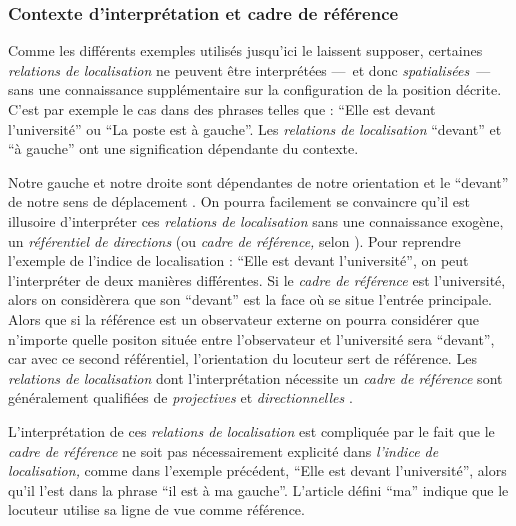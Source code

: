 \subsubsection{Contexte d'interprétation et cadre de référence}



Comme les différents exemples utilisés jusqu'ici le laissent supposer,
certaines \emph{relations de localisation} ne peuvent être
interprétées ---~et donc \emph{spatialisées}~--- sans une connaissance
supplémentaire sur la configuration de la position décrite. C'est par
exemple le cas dans des phrases telles que : \enquote{Elle est devant
  l'université} ou \enquote{La poste est à gauche}. Les
\emph{relations de localisation} \enquote{devant} et \enquote{à
  gauche} ont une signification dépendante du contexte.

Notre gauche et notre droite sont dépendantes de notre orientation et
le \enquote{devant} de notre sens de déplacement
\autocite{Vandeloise1986}. On pourra facilement se convaincre qu'il
est illusoire d'interpréter ces \emph{relations de localisation} sans
une connaissance exogène, un \emph{référentiel de directions} (ou
\emph{cadre de référence,} selon \cite{Clementini2013}). Pour
reprendre l'exemple de l'indice de localisation : \enquote{Elle est
  devant l'université}, on peut l'interpréter de deux manières
différentes. Si le \emph{cadre de référence} est l'université, alors
on considèrera que son \enquote{devant} est la face où se situe
l'entrée principale. Alors que si la référence est un observateur
externe on pourra considérer que n'importe quelle positon située entre
l'observateur et l'université sera \enquote{devant}, car avec ce
second référentiel, l'orientation du locuteur sert de référence. Les
\emph{relations de localisation} dont l'interprétation nécessite un
\emph{cadre de référence} sont généralement qualifiées de
\emph{projectives} et \emph{directionnelles} \autocite{Duchene2019}.

L'interprétation de ces \emph{relations de localisation} est
compliquée par le fait que le \emph{cadre de référence} ne soit pas
nécessairement explicité dans \emph{l'indice de localisation,} comme
dans l'exemple précédent, \enquote{Elle est devant l'université},
alors qu'il l'est dans la phrase \enquote{il est à ma
  gauche}. L'article défini \enquote{ma} indique que le locuteur
utilise sa ligne de vue comme référence.


